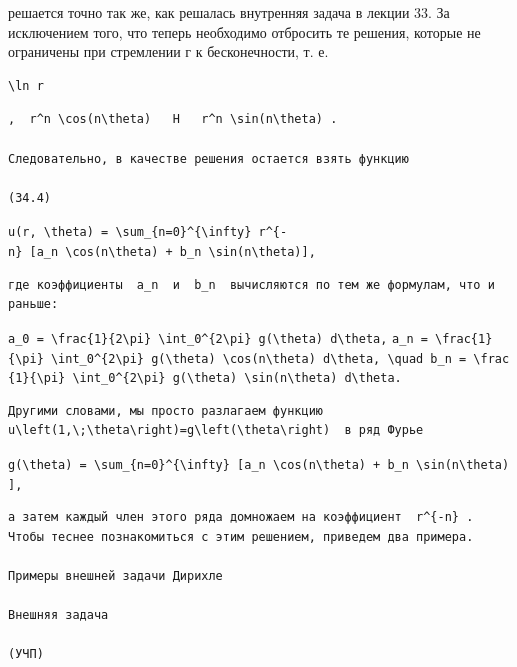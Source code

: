 \documentclass[
  ukrainian,
]{article}
\begin{document}
решается точно так же, как решалась внутренняя задача в лекции 33. За
исключением того, что теперь необходимо отбросить те решения, которые не
ограничены при стремлении г к бесконечности, т. е.

\begin{verbatim}
\ln r
\end{verbatim}

\begin{verbatim}
,  r^n \cos(n\theta)   H   r^n \sin(n\theta) .

Следовательно, в качестве решения остается взять функцию

(34.4)
\end{verbatim}

\texttt{u(r,\ \textbackslash{}theta)\ =\ \textbackslash{}sum\_\{n=0\}\^{}\{\textbackslash{}infty\}\ r\^{}\{-n\}\ {[}a\_n\ \textbackslash{}cos(n\textbackslash{}theta)\ +\ b\_n\ \textbackslash{}sin(n\textbackslash{}theta){]},}

\begin{verbatim}
где коэффициенты  a_n  и  b_n  вычисляются по тем же формулам, что и раньше:
\end{verbatim}

\texttt{a\_0\ =\ \textbackslash{}frac\{1\}\{2\textbackslash{}pi\}\ \textbackslash{}int\_0\^{}\{2\textbackslash{}pi\}\ g(\textbackslash{}theta)\ d\textbackslash{}theta,}
\texttt{a\_n\ =\ \textbackslash{}frac\{1\}\{\textbackslash{}pi\}\ \textbackslash{}int\_0\^{}\{2\textbackslash{}pi\}\ g(\textbackslash{}theta)\ \textbackslash{}cos(n\textbackslash{}theta)\ d\textbackslash{}theta,\ \textbackslash{}quad\ b\_n\ =\ \textbackslash{}frac\{1\}\{\textbackslash{}pi\}\ \textbackslash{}int\_0\^{}\{2\textbackslash{}pi\}\ g(\textbackslash{}theta)\ \textbackslash{}sin(n\textbackslash{}theta)\ d\textbackslash{}theta.}

\begin{verbatim}
Другими словами, мы просто разлагаем функцию  u\left(1,\;\theta\right)=g\left(\theta\right)  в ряд Фурье
\end{verbatim}

\texttt{g(\textbackslash{}theta)\ =\ \textbackslash{}sum\_\{n=0\}\^{}\{\textbackslash{}infty\}\ {[}a\_n\ \textbackslash{}cos(n\textbackslash{}theta)\ +\ b\_n\ \textbackslash{}sin(n\textbackslash{}theta){]},}

\begin{verbatim}
а затем каждый член этого ряда домножаем на коэффициент  r^{-n} . Чтобы теснее познакомиться с этим решением, приведем два примера.

Примеры внешней задачи Дирихле

Внешняя задача

(УЧП)
\end{verbatim}
\end{document}
